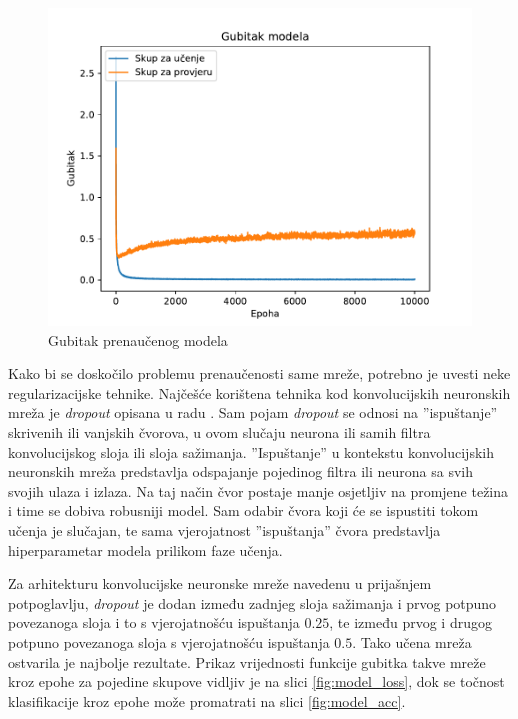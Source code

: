 \begin{figure}[htb]
    \centering
    \includegraphics[width=12cm]{images/overfit.pdf}
    \caption{Gubitak prenaučenog modela}
    \label{fig:overfit}
\end{figure}

Kako bi se doskočilo problemu prenaučenosti same mreže, potrebno je uvesti neke regularizacijske tehnike. Najčešće korištena tehnika kod konvolucijskih neuronskih mreža je \emph{dropout} opisana u radu \citep{dropout}. Sam pojam \emph{dropout} se odnosi na ''ispuštanje'' skrivenih ili vanjskih čvorova, u ovom slučaju neurona ili samih filtra konvolucijskog sloja ili sloja sažimanja. ''Ispuštanje'' u kontekstu konvolucijskih neuronskih mreža predstavlja odspajanje pojedinog filtra ili neurona sa svih svojih ulaza i izlaza. Na taj način čvor postaje manje osjetljiv na promjene težina i time se dobiva robusniji model. Sam odabir čvora koji će se ispustiti tokom učenja je slučajan, te sama vjerojatnost ''ispuštanja'' čvora predstavlja hiperparametar modela prilikom faze učenja.

Za arhitekturu konvolucijske neuronske mreže navedenu u prijašnjem potpoglavlju, \emph{dropout} je dodan između zadnjeg sloja sažimanja i prvog potpuno povezanoga sloja i to s vjerojatnošću ispuštanja $0.25$, te između prvog i drugog potpuno povezanoga sloja s vjerojatnošću ispuštanja $0.5$. Tako učena mreža ostvarila je najbolje rezultate. Prikaz vrijednosti funkcije gubitka takve mreže kroz epohe za pojedine skupove vidljiv je na slici \ref{fig:model_loss}, dok se točnost klasifikacije kroz epohe može promatrati na slici \ref{fig:model_acc}.

